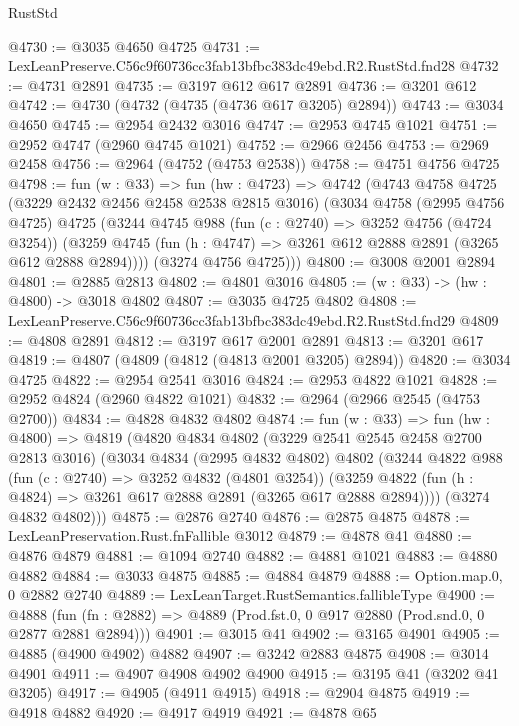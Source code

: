 \begin{lexlean}{RustStd}
\begin{coremodule}
@4730 := @3035 @4650 @4725
@4731 := LexLeanPreserve.C56c9f60736cc3fab13bfbc383dc49ebd.R2.RustStd.fnd28
@4732 := @4731 @2891
@4735 := @3197 @612 @617 @2891
@4736 := @3201 @612
@4742 := @4730 (@4732 (@4735 (@4736 @617 @3205) @2894))
@4743 := @3034 @4650
@4745 := @2954 @2432 @3016
@4747 := @2953 @4745 @1021
@4751 := @2952 @4747 (@2960 @4745 @1021)
@4752 := @2966 @2456
@4753 := @2969 @2458
@4756 := @2964 (@4752 (@4753 @2538))
@4758 := @4751 @4756 @4725
@4798 := fun (w : @33) =>
  fun (hw : @4723) =>
  @4742
    (@4743
      @4758
      @4725
      (@3229 @2432 @2456 @2458 @2538 @2815 @3016)
      (@3034
        @4758
        (@2995 @4756 @4725)
        @4725
        (@3244
          @4745
          @988
          (fun (c : @2740) => @3252 @4756 (@4724 @3254))
          (@3259 @4745 (fun (h : @4747) => @3261 @612 @2888 @2891 (@3265 @612 @2888 @2894))))
        (@3274 @4756 @4725)))
@4800 := @3008 @2001 @2894
@4801 := @2885 @2813
@4802 := @4801 @3016
@4805 := (w : @33) -> (hw : @4800) -> @3018 @4802
@4807 := @3035 @4725 @4802
@4808 := LexLeanPreserve.C56c9f60736cc3fab13bfbc383dc49ebd.R2.RustStd.fnd29
@4809 := @4808 @2891
@4812 := @3197 @617 @2001 @2891
@4813 := @3201 @617
@4819 := @4807 (@4809 (@4812 (@4813 @2001 @3205) @2894))
@4820 := @3034 @4725
@4822 := @2954 @2541 @3016
@4824 := @2953 @4822 @1021
@4828 := @2952 @4824 (@2960 @4822 @1021)
@4832 := @2964 (@2966 @2545 (@4753 @2700))
@4834 := @4828 @4832 @4802
@4874 := fun (w : @33) =>
  fun (hw : @4800) =>
  @4819
    (@4820
      @4834
      @4802
      (@3229 @2541 @2545 @2458 @2700 @2813 @3016)
      (@3034
        @4834
        (@2995 @4832 @4802)
        @4802
        (@3244
          @4822
          @988
          (fun (c : @2740) => @3252 @4832 (@4801 @3254))
          (@3259 @4822 (fun (h : @4824) => @3261 @617 @2888 @2891 (@3265 @617 @2888 @2894))))
        (@3274 @4832 @4802)))
@4875 := @2876 @2740
@4876 := @2875 @4875
@4878 := LexLeanPreservation.Rust.fnFallible @3012
@4879 := @4878 @41
@4880 := @4876 @4879
@4881 := @1094 @2740
@4882 := @4881 @1021
@4883 := @4880 @4882
@4884 := @3033 @4875
@4885 := @4884 @4879
@4888 := Option.map.{0, 0} @2882 @2740
@4889 := LexLeanTarget.RustSemantics.fallibleType
@4900 := @4888
    (fun (fn : @2882) => @4889 (Prod.fst.{0, 0} @917 @2880 (Prod.snd.{0, 0} @2877 @2881 @2894)))
@4901 := @3015 @41
@4902 := @3165 @4901
@4905 := @4885 (@4900 @4902) @4882
@4907 := @3242 @2883 @4875
@4908 := @3014 @4901
@4911 := @4907 @4908 @4902 @4900
@4915 := @3195 @41 (@3202 @41 @3205)
@4917 := @4905 (@4911 @4915)
@4918 := @2904 @4875
@4919 := @4918 @4882
@4920 := @4917 @4919
@4921 := @4878 @65

\end{coremodule}
\end{lexlean}
